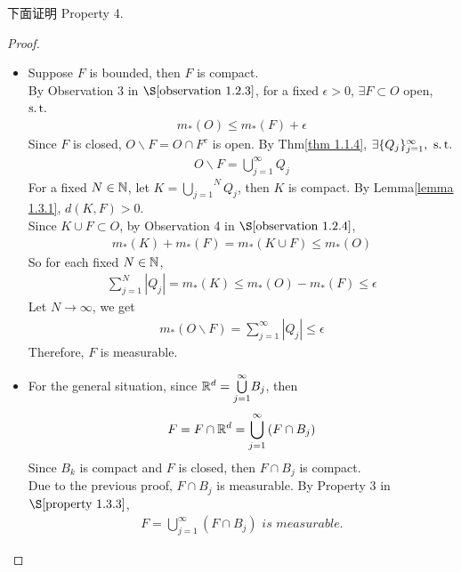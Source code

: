 \begin{enumerate}
		\newpage
		下面证明 Property 4.
		\begin{proof}
			\begin{itemize}
				\item Suppose $F$ is bounded, then $F$ is compact.\\
				By Observation 3 in $\S \ref{observation 1.2.3}$, for a fixed $\epsilon > 0$, $\exists F \subset O$ open, $\operatorname{s.t.}$
				\begin{align}
					m_{*}(O) \leq m_{*}(F) + \epsilon
				\end{align}
				Since $F$ is closed, $O \backslash F = O \cap F^c$ is open. By Thm\ref{thm 1.1.4}, $\exists \{ Q_j \}_{j = 1}^{\infty} , \,\, \operatorname{s.t.}$
				\begin{align}
					O \backslash F = \bigcup_{j = 1}^{\infty}{Q_j}
				\end{align}
				For a fixed $N \in \mathbb{N}$, let $K = \overset{N}{\underset{j = 1}{\bigcup}}{Q_j}$, then $K$ is compact. By Lemma\ref{lemma 1.3.1}, $d(K , F) > 0$.\\
				Since $K \cup F \subset O$, by Observation 4 in $\S\ref{observation 1.2.4}$,
				\begin{align}
					m_{*}(K) + m_{*}(F) = m_{*}(K \cup F) \leq m_{*}(O)
				\end{align}
				So for each fixed $N \in \mathbb{N}$,
				\begin{align}
					\sum_{j = 1}^{N}{\left| Q_j \right|} = m_{*}(K) \leq m_{*}(O) - m_{*}(F) \leq \epsilon
				\end{align}
				Let $N \to \infty$, we get
				\begin{align}
					m_{*}(O \backslash F) = \sum_{j = 1}^{\infty}{\left| Q_j \right|} \leq \epsilon
				\end{align}
				Therefore, $F$ is measurable.
				
				\vspace{1em}
				
				\item For the general situation, since $\mathbb{R}^d = \overset{\infty}{\underset{j = 1}{\bigcup}}{B_j}$, then
				\begin{align}
					F = F \cap \mathbb{R}^d = \bigcup_{j = 1}^{\infty}{\left( F \cap B_j \right)}
				\end{align}
				Since $B_k$ is compact and $F$ is closed, then $F \cap B_j$ is compact.\\
				Due to the previous proof, $F \cap B_j$ is measurable. By Property 3 in $\S\ref{property 1.3.3}$,
				\begin{align}
					F = \bigcup_{j = 1}^{\infty}{\left( F \cap B_j \right)} \,\, is \,\, measurable.
				\end{align}
			\end{itemize}
		\end{proof}
		

\end{enumerate}
